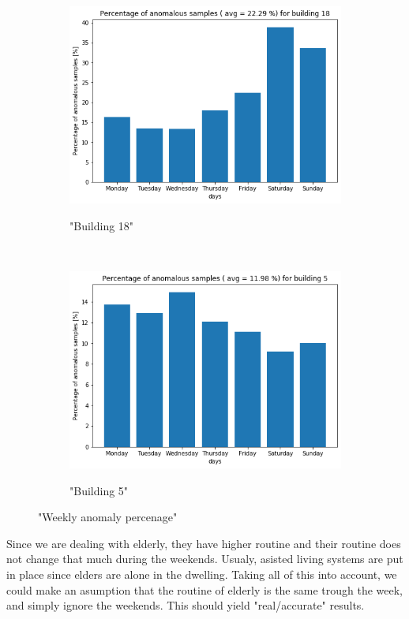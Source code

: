 \begin{figure}[H]
    \begin{subfigure}{.5\textwidth}
		\caption{"Building 18"}
		\includegraphics[width=1\linewidth]{../Figures/EC/b18week.png}
		\label{fig:ec_b18week}
	\end{subfigure}%
    ~ 
    \begin{subfigure}{.5\textwidth}
		\caption{"Building 5"}
		\includegraphics[width=1\linewidth]{../Figures/EC/b5weekd.png}
		\label{fig:ec_b5week}
	\end{subfigure}%
	\label{fig:ec_week}
	\caption{"Weekly anomaly percenage"}
\end{figure}

Since we are dealing with elderly, they have higher routine and their routine does not change that much during the weekends. 
Usualy, asisted living systems are put in place since elders are alone in the dwelling.
Taking all of this into account, we could make an asumption that the routine of elderly is the same trough the week, and simply ignore the weekends. 
This should yield "real/accurate" results. 

